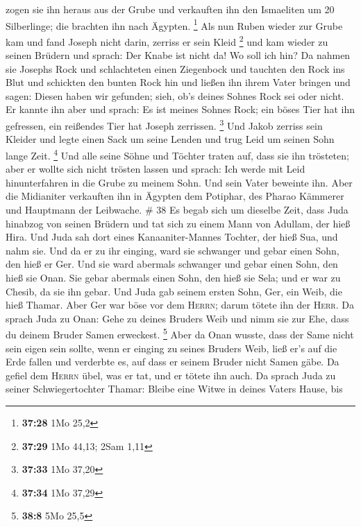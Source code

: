 zogen sie ihn heraus aus der Grube und verkauften ihn den Ismaeliten um
20 Silberlinge; die brachten ihn nach Ägypten. \footnote{\textbf{37:28}
  1Mo 25,2}  Als nun Ruben wieder zur Grube kam und fand
Joseph nicht darin, zerriss er sein Kleid \footnote{\textbf{37:29} 1Mo
  44,13; 2Sam 1,11}  und kam wieder zu seinen Brüdern und
sprach: Der Knabe ist nicht da! Wo soll ich hin?  Da
nahmen sie Josephs Rock und schlachteten einen Ziegenbock und tauchten
den Rock ins Blut  und schickten den bunten Rock hin und
ließen ihn ihrem Vater bringen und sagen: Diesen haben wir gefunden;
sieh, ob's deines Sohnes Rock sei oder nicht.  Er kannte
ihn aber und sprach: Es ist meines Sohnes Rock; ein böses Tier hat ihn
gefressen, ein reißendes Tier hat Joseph zerrissen. \footnote{\textbf{37:33}
  1Mo 37,20}  Und Jakob zerriss sein Kleider und legte
einen Sack um seine Lenden und trug Leid um seinen Sohn lange Zeit.
\footnote{\textbf{37:34} 1Mo 37,29}  Und alle seine Söhne
und Töchter traten auf, dass sie ihn trösteten; aber er wollte sich
nicht trösten lassen und sprach: Ich werde mit Leid hinunterfahren in
die Grube zu meinem Sohn. Und sein Vater beweinte ihn. 
Aber die Midianiter verkauften ihn in Ägypten dem Potiphar, des Pharao
Kämmerer und Hauptmann der Leibwache. \# 38  Es begab sich
um dieselbe Zeit, dass Juda hinabzog von seinen Brüdern und tat sich zu
einem Mann von Adullam, der hieß Hira.  Und Juda sah dort
eines Kanaaniter-Mannes Tochter, der hieß Sua, und nahm sie. Und da er
zu ihr einging,  ward sie schwanger und gebar einen Sohn,
den hieß er Ger.  Und sie ward abermals schwanger und
gebar einen Sohn, den hieß sie Onan.  Sie gebar abermals
einen Sohn, den hieß sie Sela; und er war zu Chesib, da sie ihn gebar.
 Und Juda gab seinem ersten Sohn, Ger, ein Weib, die hieß
Thamar.  Aber Ger war böse vor dem \textsc{Herrn}; darum
tötete ihn der \textsc{Herr}.  Da sprach Juda zu Onan:
Gehe zu deines Bruders Weib und nimm sie zur Ehe, dass du deinem Bruder
Samen erweckest. \footnote{\textbf{38:8} 5Mo 25,5}  Aber
da Onan wusste, dass der Same nicht sein eigen sein sollte, wenn er
einging zu seines Bruders Weib, ließ er's auf die Erde fallen und
verderbte es, auf dass er seinem Bruder nicht Samen gäbe.
 Da gefiel dem \textsc{Herrn} übel, was er tat, und er
tötete ihn auch.  Da sprach Juda zu seiner
Schwiegertochter Thamar: Bleibe eine Witwe in deines Vaters Hause, bis
